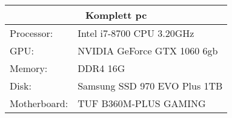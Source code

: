 \begin{table}[]
    \begin{tabular}{ll}
    \hline
    \multicolumn{2}{|c|}{Komplett pc}           \\ \hline
    Processor:   & Intel i7-8700 CPU 3.20GHz    \\
    GPU:         & NVIDIA GeForce GTX 1060 6gb  \\
    Memory:      & DDR4 16G                     \\
    Disk:        & Samsung SSD 970 EVO Plus 1TB \\
    Motherboard: & TUF B360M-PLUS GAMING       
    \end{tabular}
    \end{table}